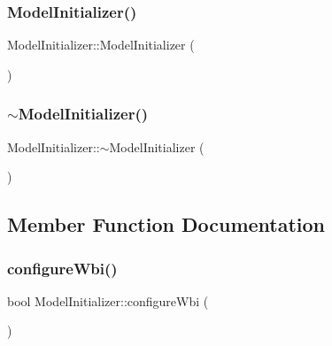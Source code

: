 \subsubsection{\texorpdfstring{Model\+Initializer()}{ModelInitializer()}}
{\footnotesize\ttfamily Model\+Initializer\+::\+Model\+Initializer (\begin{DoxyParamCaption}{ }\end{DoxyParamCaption})}

\hypertarget{classocra__icub_1_1ModelInitializer_af72e47a78f20f34f77be2b9e6921ca19}{}\label{classocra__icub_1_1ModelInitializer_af72e47a78f20f34f77be2b9e6921ca19} 
\subsubsection{\texorpdfstring{$\sim$\+Model\+Initializer()}{~ModelInitializer()}}
{\footnotesize\ttfamily Model\+Initializer\+::$\sim$\+Model\+Initializer (\begin{DoxyParamCaption}{ }\end{DoxyParamCaption})\hspace{0.3cm}{\ttfamily [virtual]}}



\subsection{Member Function Documentation}
\hypertarget{classocra__icub_1_1ModelInitializer_afa7e888280149483f0ff27ced546801b}{}\label{classocra__icub_1_1ModelInitializer_afa7e888280149483f0ff27ced546801b} 
\subsubsection{\texorpdfstring{configure\+Wbi()}{configureWbi()}}
{\footnotesize\ttfamily bool Model\+Initializer\+::configure\+Wbi (\begin{DoxyParamCaption}{ }\end{DoxyParamCaption})\hspace{0.3cm}{\ttfamily [private]}}

